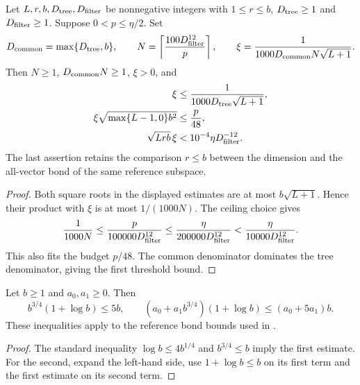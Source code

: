\begin{lemma}
    \label{lem:viable_refinement_radius_parameters}
    \leanok
    Let $L,r,b,D_{\rm tree},D_{\rm filter}$ be nonnegative integers with
    $1\le r\le b$, $D_{\rm tree}\ge1$ and $D_{\rm filter}\ge1$.
    Suppose $0<p\le\eta/2$. Set
    \[
        D_{\rm common}=\max\{D_{\rm tree},b\},\qquad
        N=\left\lceil\frac{100D_{\rm filter}^{12}}p\right\rceil,
        \qquad
        \xi=\frac1{1000D_{\rm common}N\sqrt{L+1}}.
    \]
    Then $N\ge1$, $D_{\rm common}N\ge1$, $\xi>0$, and
    \begin{align*}
        \xi                        & \le\frac1{1000D_{\rm tree}\sqrt{L+1}}, \\
        \xi\sqrt{\max\{L-1,0\}b^2} & \le\frac p{48},                        \\
        \sqrt{Lrb}\,\xi            & <10^{-4}\eta D_{\rm filter}^{-12}.
    \end{align*}
    The last assertion retains the comparison $r\le b$ between the
    dimension and the all-vector bond of the same reference subspace.
\end{lemma}
\begin{proof}\leanok
    Both square roots in the displayed estimates are at most
    $b\sqrt{L+1}$. Hence their product with $\xi$ is at most $1/(1000N)$.
    The ceiling choice gives
    \[
        \frac1{1000N}\le\frac p{100000D_{\rm filter}^{12}}
        \le\frac\eta{200000D_{\rm filter}^{12}}
        <\frac\eta{10000D_{\rm filter}^{12}}.
    \]
    This also fits the budget $p/48$. The common denominator dominates
    the tree denominator, giving the first threshold bound.
\end{proof}

\begin{lemma}
    \label{lem:reference_log_bound_le_linear}
    \leanok
    Let $b\ge1$ and $a_0,a_1\ge0$. Then
    \[
        b^{3/4}(1+\log b)\le5b,
        \qquad
        (a_0+a_1b^{3/4})(1+\log b)\le(a_0+5a_1)b.
    \]
    These inequalities apply to the reference bond bounds used in
    \cite[Figure~\texttt{fig:algo1}, lines 1633--1640]{Arad2016RigorousRG}.
\end{lemma}
\begin{proof}\leanok
    The standard inequality $\log b\le4b^{1/4}$ and $b^{3/4}\le b$
    imply the first estimate. For the second, expand the left-hand side,
    use $1+\log b\le b$ on its first term and the first estimate on its
    second term.
\end{proof}

